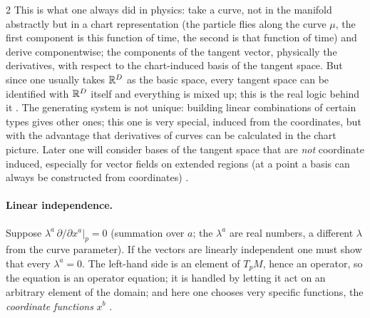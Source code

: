 \begin{paracol}{2}
This is what one always did in physics: take a curve, not in the manifold abstractly but in a chart representation (the particle flies along the curve $\mu$, the first component is this function of time, the second is that function of time) and derive componentwise; the components of the tangent vector, physically the derivatives,
with respect to the chart-induced basis of the tangent space. But since one usually takes $\mathbb{R}^D$ as the basic space, every tangent space can be identified with $\mathbb{R}^D$ itself and everything is mixed up; this is the real logic behind it    .
The generating system is not unique: building linear combinations of certain types gives other ones; this one is very special, induced from the coordinates, but with the advantage that derivatives of curves can be calculated in the chart picture. Later one will consider bases of the tangent space that are \emph{not} coordinate
induced, especially for vector fields on extended regions (at a point a basis can always be constructed from coordinates)    .

\paragraph{Linear independence.} Suppose $\lambda^a\,\partial/\partial x^a|_p=0$ (summation over $a$; the $\lambda^a$ are real numbers, a different $\lambda$ from the curve parameter). If the vectors are linearly independent one must show that every $\lambda^a=0$. The left-hand side is an element of $T_pM$, hence an operator, so
the equation is an operator equation; it is handled by letting it act on an arbitrary element of the domain; and here one chooses very specific functions, the \emph{coordinate functions} $x^b$    .


\end{paracol}
